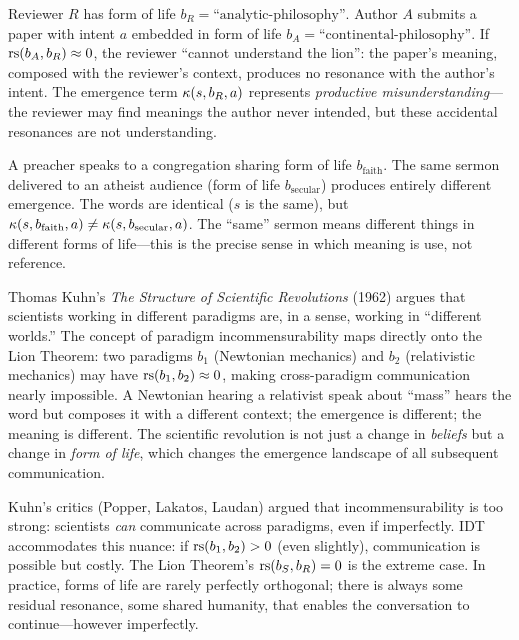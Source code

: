 \begin{example}
Reviewer $R$ has form of life $b_R = \text{``analytic-philosophy''}$. Author
$A$ submits a paper with intent $a$ embedded in form of life
$b_A = \text{``continental-philosophy''}$. If $\mathrm{rs}(b_A, b_R) \approx 0$, the
reviewer ``cannot understand the lion'': the paper's meaning, composed with
the reviewer's context, produces no resonance with the author's intent. The
emergence term $\kappa(s, b_R, a)$ represents \emph{productive
misunderstanding}---the reviewer may find meanings the author never intended,
but these accidental resonances are not understanding.
\end{example}

\begin{example}
A preacher speaks to a congregation sharing form of life $b_\text{faith}$.
The same sermon delivered to an atheist audience (form of life
$b_\text{secular}$) produces entirely different emergence. The words are
identical ($s$ is the same), but $\kappa(s, b_\text{faith}, a) \neq
\kappa(s, b_\text{secular}, a)$. The ``same'' sermon means different things
in different forms of life---this is the precise sense in which meaning is
use, not reference.
\end{example}

\begin{remark}
Thomas Kuhn's \emph{The Structure of Scientific Revolutions} (1962)
argues that scientists working in different paradigms are, in a sense,
working in ``different worlds.'' The concept of paradigm
incommensurability maps directly onto the Lion Theorem: two paradigms
$b_1$ (Newtonian mechanics) and $b_2$ (relativistic mechanics) may have
$\mathrm{rs}(b_1, b_2) \approx 0$, making cross-paradigm communication nearly
impossible. A Newtonian hearing a relativist speak about ``mass''
hears the word but composes it with a different context; the emergence
is different; the meaning is different. The scientific revolution is
not just a change in \emph{beliefs} but a change in \emph{form of
life}, which changes the emergence landscape of all subsequent
communication.

Kuhn's critics (Popper, Lakatos, Laudan) argued that incommensurability
is too strong: scientists \emph{can} communicate across paradigms,
even if imperfectly. IDT accommodates this nuance: if
$\mathrm{rs}(b_1, b_2) > 0$ (even slightly), communication is possible but
costly. The Lion Theorem's $\mathrm{rs}(b_S, b_R) = 0$ is the extreme case.
In practice, forms of life are rarely perfectly orthogonal; there is
always some residual resonance, some shared humanity, that enables
the conversation to continue---however imperfectly.
\end{remark}


